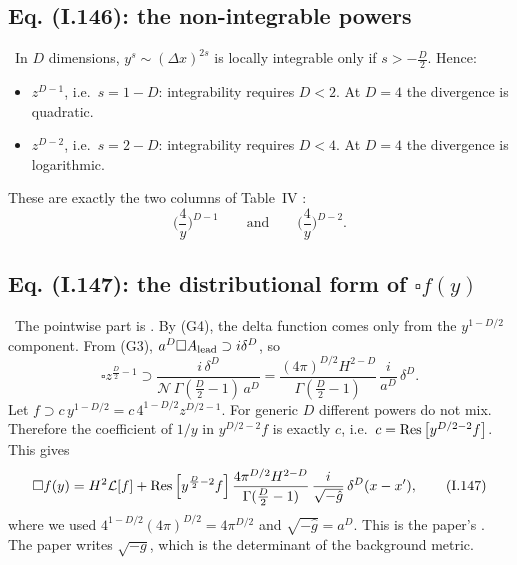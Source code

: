 \subsection{Eq. (I.146): the non-integrable powers}
\tD\ In $D$ dimensions, $y^s\sim(\Delta x)^{2s}$ is locally integrable only if $s>-\tfrac D2$. Hence:
\begin{itemize}[itemsep=1pt]
\item $z^{D-1}$, i.e.\ $s=1-D$: integrability requires $D<2$. At $D=4$ the divergence is quadratic.
\item $z^{D-2}$, i.e.\ $s=2-D$: integrability requires $D<4$. At $D=4$ the divergence is logarithmic.
\end{itemize}
These are exactly the two columns of Table~IV \chEok:
\begin{equation}
\Big(\frac4y\Big)^{D-1}\qquad\text{and}\qquad\Big(\frac4y\Big)^{D-2}.
\tag{I.146}
\end{equation}

\subsection{Eq. (I.147): the distributional form of $\square f(y)$}
\tD\ The pointwise part is . By (G4), the delta function comes only from the $y^{1-D/2}$ component.
From (G3), $a^D\square A_{\rm lead}\supset i\delta^D$, so
\begin{equation}
\square z^{\frac D2-1}\supset\frac{i\,\delta^D}{\mathcal N\,\Gamma(\frac D2-1)\,a^D}
=\frac{(4\pi)^{D/2}H^{2-D}}{\Gamma(\frac D2-1)}\,\frac{i}{a^D}\,\delta^D .
\label{eq:ch08-boxlead}
\end{equation}
Let $f\supset c\,y^{1-D/2}=c\,4^{1-D/2}z^{D/2-1}$. For generic $D$ different powers do not mix.
Therefore the coefficient of $1/y$ in $y^{D/2-2}f$ is exactly $c$, i.e.\ $c=\operatorname{Res}\big[y^{D/2-2}f\big]$. This gives
\begin{equation}
\square f(y)=H^2\mathcal L[f]+\operatorname{Res}\Big[y^{\frac D2-2}f\Big]\,\frac{4\pi^{D/2}H^{2-D}}{\Gamma(\frac D2-1)}\,\frac{i}{\sqrt{-\hat g}}\,\delta^D(x-x') ,
\tag{I.147}
\end{equation}
where we used $4^{1-D/2}(4\pi)^{D/2}=4\pi^{D/2}$ and $\sqrt{-\hat g}=a^D$.
This is the paper's  \chEok. The paper writes $\sqrt{-g}$, which is the determinant of the background metric.


